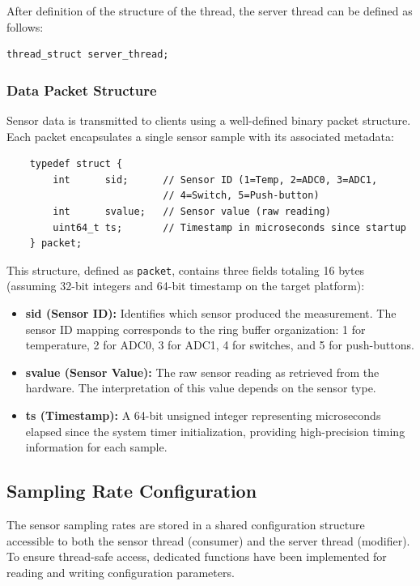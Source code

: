 After definition of the structure of the thread, the server thread can be defined as follows: 

\begin{verbatim}
thread_struct server_thread;
\end{verbatim}

\subsubsection{Data Packet Structure}

Sensor data is transmitted to clients using a well-defined binary packet structure. Each packet encapsulates a single sensor sample with its associated metadata:

\begin{verbatim}
	typedef struct {
		int      sid;      // Sensor ID (1=Temp, 2=ADC0, 3=ADC1, 
						   // 4=Switch, 5=Push-button)
		int      svalue;   // Sensor value (raw reading)
		uint64_t ts;       // Timestamp in microseconds since startup
	} packet;
\end{verbatim}

This structure, defined as \texttt{packet}, contains three fields totaling 16 bytes (assuming 32-bit integers and 64-bit timestamp on the target platform):

\begin{itemize}
	\item \textbf{sid (Sensor ID):} Identifies which sensor produced the measurement. The sensor ID mapping corresponds to the ring buffer organization: 1 for temperature, 2 for ADC0, 3 for ADC1, 4 for switches, and 5 for push-buttons.
	\item \textbf{svalue (Sensor Value):} The raw sensor reading as retrieved from the hardware. The interpretation of this value depends on the sensor type.
	\item \textbf{ts (Timestamp):} A 64-bit unsigned integer representing microseconds elapsed since the system timer initialization, providing high-precision timing information for each sample.
\end{itemize}


\subsection{Sampling Rate Configuration}
The sensor sampling rates are stored in a shared configuration structure accessible to both the sensor thread (consumer) and the server thread (modifier). To ensure thread-safe access, dedicated functions have been implemented for reading and writing configuration parameters.

